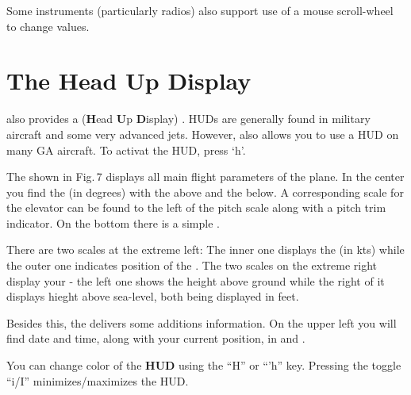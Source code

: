 Some instruments (particularly radios) also support use of a mouse scroll-wheel
to change values.

\section{The Head Up Display}

\FlightGear{} also provides a  (\textbf{H}ead \textbf{U}p
\textbf{D}isplay) . HUDs are generally found in military
aircraft and some very advanced jets. However, \FlightGear{} also allows you
to use a HUD on many GA aircraft. To activat the HUD, press `h'.

The  shown in Fig.\,7  displays all main flight parameters of the
plane. In the center you find the  (in degrees) with the
 above and the  below. A
corresponding scale for the elevator can be found
to the left of the pitch scale along with a pitch trim indicator. On the bottom
there is a simple .

There are two scales at the extreme left: The inner one displays the 
 (in kts) while the outer one indicates position of the .
The two scales on the extreme right display your  - the left one
shows the height above ground while the right of it displays hieght above sea-level,
both being displayed in feet.

Besides this, the  delivers some additions information. On the upper
left you will find date and time, along with your current position, in 
and .

You can change color of the \textbf{HUD} using the ``H'' or ``'h''  key.
Pressing the toggle ``i/I'' minimizes/maximizes the HUD.

\medskip

 \centerline{}

